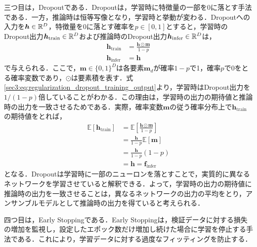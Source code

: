 \documentclass[12pt]{jarticle}
\numberwithin{equation}{section}    %
\numberwithin{figure}{section}      %
\numberwithin{table}{section}      %
\begin{document}
三つ目は，Dropout\cite{srivastava2014dropout}である．Dropoutは，学習時に特徴量の一部を0に落とす手法である．一方，推論時は恒等写像となり，学習時と挙動が変わる．Dropoutへの入力を$\bm{h} \in \mathbb{R}^{D}$，特徴量を0に落とす確率を$p \in [0, 1]$とすると，学習時のDropout出力$\bm{h}_{\text{train}} \in \mathbb{R}^{D}$および推論時のDropout出力$\bm{h}_{\text{infer}} \in \mathbb{R}^{D}$は，
\begin{align}
    \bm{h}_{\text{train}} & = \frac{\bm{h} \odot \bm{m}}{1 - p} \label{sec3:eq:regularization_dropout_training_output} \\
    \bm{h}_{\text{infer}} & = \bm{h}
\end{align}
で与えられる．ここで，$\bm{m} \in \{0, 1\}^{D}$は各要素$\bm{m}_{d}$が確率$1 - p$で1，確率$p$で0をとる確率変数であり，$\odot$は要素積を表す．式\eqref{sec3:eq:regularization_dropout_training_output}より，学習時はDropout出力を$1 / (1 - p)$倍していることがわかる．この理由は，学習時の出力の期待値と推論時の出力を一致させるためである．実際，確率変数$\bm{m}$の従う確率分布上で$\bm{h}_{\text{train}}$の期待値をとれば，
\begin{align}
    \mathbb{E}[\bm{h}_{\text{train}}] & = \mathbb{E} \left[ \frac{\bm{h} \odot \bm{m}}{1 - p} \right] \\
                                      & = \frac{\bm{h}}{1 - p} \mathbb{E}[\bm{m}]                     \\
                                      & = \frac{\bm{h}}{1 - p} (1 - p)                                \\
                                      & = \bm{h} = \bm{f}_{\text{infer}}
\end{align}
となる．Dropoutは学習時に一部のニューロンを落とすことで，実質的に異なるネットワークを学習させていると解釈できる．よって，学習時の出力の期待値に推論時の出力を一致させることは，異なるネットワークの出力の平均をとり，アンサンブルモデルとして推論時の出力を得ていると考えられる．

四つ目は，Early Stoppingである．Early Stoppingは，検証データに対する損失の増加を監視し，設定したエポック数だけ増加し続けた場合に学習を停止する手法である．これにより，学習データに対する過度なフィッティングを防止する．
\end{document}
